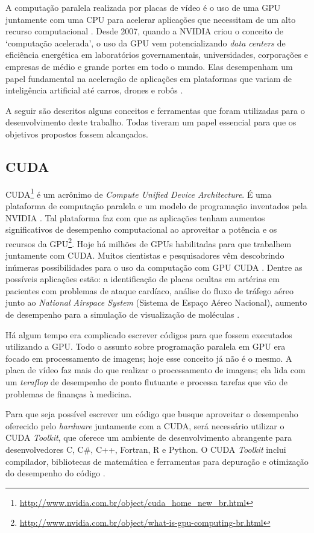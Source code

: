 \documentclass[
	12pt,				%
	twoside,			%
	a4paper,			%
	english,			%
	french,				%
	spanish,			%
	brazil				%
	]{abntex2}
\begin{document}
A computação paralela realizada por placas de vídeo é o uso de uma GPU
juntamente com uma CPU para acelerar aplicações que necessitam de um
alto recurso computacional \cite{KIRK}. Desde 2007, quando a NVIDIA
criou o conceito de `computação acelerada', o uso da GPU vem
potencializando \emph{data centers} de eficiência energética em
laboratórios governamentais, universidades, corporações e empresas de
médio e grande portes em todo o mundo. Elas desempenham um papel
fundamental na aceleração de aplicações em plataformas que variam de
inteligência artificial até carros, drones e robôs \cite{NVIDIA}.

A seguir são descritos alguns conceitos e ferramentas que foram
utilizadas para o desenvolvimento deste trabalho. Todas tiveram um papel
essencial para que os objetivos propostos fossem alcançados.

\subsection{CUDA}\label{cuda}

CUDA\footnote{\url{http://www.nvidia.com.br/object/cuda_home_new_br.html}}
é um acrônimo de \emph{Compute Unified Device Architecture}. É uma
plataforma de computação paralela e um modelo de programação inventados
pela NVIDIA \cite{NVIDIA}. Tal plataforma faz com que as aplicações
tenham aumentos significativos de desempenho computacional ao aproveitar
a potência e os recursos da GPU\footnote{\url{http://www.nvidia.com.br/object/what-is-gpu-computing-br.html}}.
Hoje há milhões de GPUs habilitadas para que trabalhem juntamente com
CUDA. Muitos cientistas e pesquisadores vêm descobrindo inúmeras
possibilidades para o uso da computação com GPU CUDA . Dentre as
possíveis aplicações estão: a identificação de placas ocultas em
artérias em pacientes com problemas de ataque cardíaco, análise do fluxo
de tráfego aéreo junto ao \emph{National Airspace System} (Sistema de
Espaço Aéreo Nacional), aumento de desempenho para a simulação de
visualização de moléculas \cite{KIRK}.

Há algum tempo era complicado escrever códigos para que fossem
executados utilizando a GPU. Todo o assunto sobre programação paralela
em GPU era focado em processamento de imagens; hoje esse conceito já não
é o mesmo. A placa de vídeo faz mais do que realizar o processamento de
imagens; ela lida com um \emph{teraflop} de desempenho de ponto
flutuante e processa tarefas que vão de problemas de finanças à
medicina.

Para que seja possível escrever um código que busque aproveitar o
desempenho oferecido pelo \emph{hardware} juntamente com a CUDA, será
necessário utilizar o CUDA \emph{Toolkit}, que oferece um ambiente de
desenvolvimento abrangente para desenvolvedores C, C\#, C++, Fortran, R
e Python. O CUDA \emph{Toolkit} inclui compilador, bibliotecas de
matemática e ferramentas para depuração e otimização do desempenho do
código \cite{FARBER}.
\end{document}
